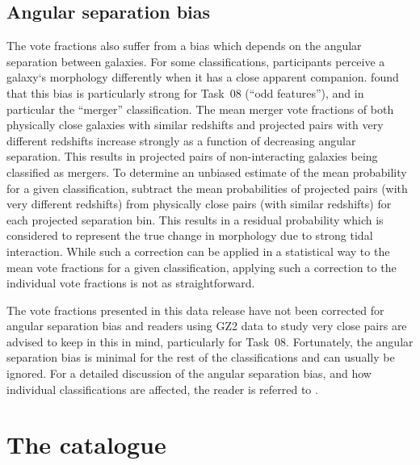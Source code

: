 \documentclass[useAMS,usenatbib]{mn2e}
\begin{document}
\subsection{Angular separation bias}\label{ang-bias}

The vote fractions also suffer from a bias which depends on the angular separation between galaxies. For some classifications, participants perceive a galaxy`s morphology differently when it has a close apparent companion. \citet{cas13} found that this bias is particularly strong for Task~08 (``odd features''), and in particular the ``merger'' classification. The mean merger vote fractions of both physically close galaxies with similar redshifts and projected pairs with very different redshifts increase strongly as a function of decreasing angular separation. This results in projected pairs of non-interacting galaxies being classified as mergers. To determine an unbiased estimate of the mean probability for a given classification, \citet{cas13} subtract the mean probabilities of projected pairs (with very different redshifts) from physically close pairs (with similar redshifts) for each projected separation bin. This results in a residual probability which is considered to represent the true change in morphology due to strong tidal interaction. While such a correction can be applied in a statistical way to the mean vote fractions for a given classification, applying such a correction to the individual vote fractions is not as straightforward.

The vote fractions presented in this data release have not been corrected for angular separation bias and readers using GZ2 data to study very close pairs are advised to keep in this in mind, particularly for Task~08. Fortunately, the angular separation bias is minimal for the rest of the classifications and can usually be ignored. For a detailed discussion of the angular separation bias, and how individual classifications are affected, the reader is referred to \citet{cas13}.


\section{The catalogue} \label{sec-catalogue}

\end{document}
